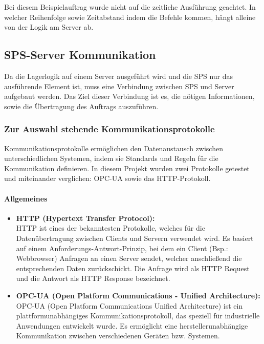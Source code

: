     Bei diesem Beispielauftrag wurde nicht auf die zeitliche Ausführung geachtet. In welcher Reihenfolge sowie Zeitabstand indem die Befehle kommen, hängt alleine von der Logik am Server ab.

\subsection{SPS-Server Kommunikation}
Da die Lagerlogik auf einem Server ausgeführt wird und die SPS nur das ausführende Element ist, muss eine Verbindung zwischen SPS und Server aufgebaut werden. Das Ziel dieser Verbindung ist es, die nötigen Informationen, sowie die Übertragung des Auftrags auszuführen. 

    \subsubsection{Zur Auswahl stehende Kommunikationsprotokolle} 
    \label{Kommunikationsprotokolle}

    Kommunikationsprotokolle ermöglichen den Datenaustausch zwischen unterschiedlichen Systemen, indem sie Standards und Regeln für die Kommunikation definieren. In diesem Projekt wurden zwei Protokolle getestet und miteinander verglichen: OPC-UA sowie das HTTP-Protokoll.


    \paragraph{Allgemeines}

        \begin{itemize}
            \item \textbf{HTTP (Hypertext Transfer Protocol):}  \mbox{} \\
            HTTP ist eines der bekanntesten Protokolle, welches für die Datenübertragung zwischen Clients und Servern verwendet wird. Es basiert auf einem Anforderungs-Antwort-Prinzip, bei dem ein Client (Bsp.: Webbrowser) Anfragen an einen Server sendet, welcher anschließend die entsprechenden Daten zurückschickt. Die Anfrage wird als HTTP Request und die Antwort als HTTP Response bezeichnet.\cite{HTTP-Allgemein}
            
            \item \textbf{OPC-UA (Open Platform Communications - Unified Architecture):} \mbox{} \\
            OPC-UA (Open Platform Communications Unified Architecture) ist ein plattformunabhängiges Kommunikationsprotokoll, das speziell für industrielle Anwendungen entwickelt wurde. Es ermöglicht eine herstellerunabhängige Kommunikation zwischen verschiedenen Geräten bzw. Systemen. \cite{OPC-UA}
        \end{itemize}

